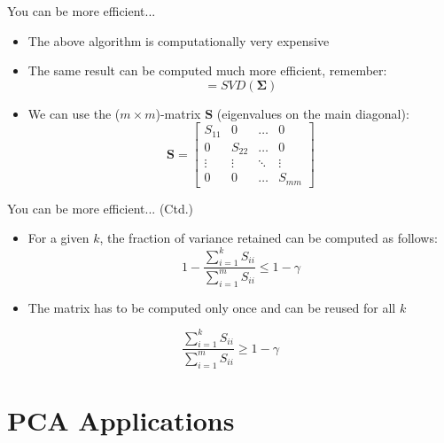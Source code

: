 \begin{frame}{You can be more efficient...}{}
	\begin{itemize}
		\item The above algorithm is computationally very expensive
		\item The same result can be computed much more efficient, remember:
		\begin{equation}
			[\bm{U}, \bm{S}, \bm{V}] = SVD(\bm{\Sigma})
		\end{equation}
		\item We can use the ($m \times m$)-matrix $\bm{S}$ (eigenvalues on the main diagonal):
		\footnotesize
		\begin{equation}
			\bm{S} =
			\begin{bmatrix}
				S_{11} 	& 0 		& \hdots 	& 0 			\\
				0 		& S_{22} 	& \hdots 	& 0 			\\
				\vdots 	& \vdots 	& \ddots 	& \vdots 		\\
				0 		& 0 		& \hdots 	& S_{mm}
			\end{bmatrix}
		\end{equation}
	\end{itemize}
\end{frame}


\begin{frame}{You can be more efficient... (Ctd.)}{}\important
	\begin{itemize}
		\item For a given $k$, the fraction of variance retained can be computed as follows:
		\begin{equation}
			1 - \frac{\sum_{i=1}^k S_{ii}}{\sum_{i=1}^m S_{ii}} \le 1 - \gamma
		\end{equation}
		\item The matrix has to be computed only once and can be reused for all $k$
	\end{itemize}
	\begin{boxBlueNoFrame}
		\begin{equation*}
			\frac{\sum_{i=1}^k S_{ii}}{\sum_{i=1}^m S_{ii}} \ge 1 - \gamma
		\end{equation*}
	\end{boxBlueNoFrame}
\end{frame}


\section{PCA Applications}

